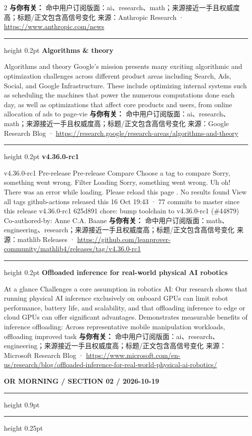 \documentclass[10.5pt]{ctexart}
\begin{document}
\begin{multicols}{2}
\textbf{与你有关：} 命中用户订阅版面：ai、research、math；来源接近一手且权威度高；标题/正文包含高信号变化
{\footnotesize\color{ormuted} 来源：Anthropic Research · \url{https://www.anthropic.com/news}}
\vspace{2mm}
\hrule height 0.2pt
\vspace{2mm}
{\large\bfseries Algorithms \& theory}\par
Algorithms and theory Google’s mission presents many exciting algorithmic and optimization challenges across different product areas including Search, Ads, Social, and Google Infrastructure. These include optimizing internal systems such as scheduling the machines that power the numerous computations done each day, as well as optimizations that affect core products and users, from online allocation of ads to page-vie
\textbf{与你有关：} 命中用户订阅版面：ai、research、math；来源接近一手且权威度高；标题/正文包含高信号变化
{\footnotesize\color{ormuted} 来源：Google Research Blog · \url{https://research.google/research-areas/algorithms-and-theory}}
\vspace{2mm}
\hrule height 0.2pt
\vspace{2mm}
{\large\bfseries v4.36.0-rc1}\par
v4.36.0-rc1 Pre-release Pre-release Compare Choose a tag to compare Sorry, something went wrong. Filter Loading Sorry, something went wrong. Uh oh! There was an error while loading. Please reload this page . No results found View all tags github-actions released this 16 Oct 19:43 · 77 commits to master since this release v4.36.0-rc1 625d891 chore: bump toolchain to v4.36.0-rc1 (\#44879) Co-authored-by: Anne C.A. Baane
\textbf{与你有关：} 命中用户订阅版面：math、engineering、research；来源接近一手且权威度高；标题/正文包含高信号变化
{\footnotesize\color{ormuted} 来源：mathlib Releases · \url{https://github.com/leanprover-community/mathlib4/releases/tag/v4.36.0-rc1}}
\vspace{2mm}
\hrule height 0.2pt
\vspace{2mm}
{\large\bfseries Offloaded inference for real-world physical AI robotics}\par
At a glance Challenges a core assumption in robotics AI: Our research shows that running physical AI inference exclusively on onboard GPUs can limit robot performance, battery life, and scalability, and that offloading inference to edge or cloud GPUs can offer significant advantages. Demonstrates measurable benefits of inference offloading: Across representative mobile manipulation workloads, offloading improved task
\textbf{与你有关：} 命中用户订阅版面：ai、research、engineering；来源接近一手且权威度高；标题/正文包含高信号变化
{\footnotesize\color{ormuted} 来源：Microsoft Research Blog · \url{https://www.microsoft.com/en-us/research/blog/offloaded-inference-for-real-world-physical-ai-robotics/}}
\end{multicols}
\newpage
{\small\bfseries OR MORNING / SECTION 02 / 2026-10-19}
\vspace{2mm}
\hrule height 0.9pt
\vspace{1.5mm}
\hrule height 0.25pt
\vspace{4mm}
\end{document}

